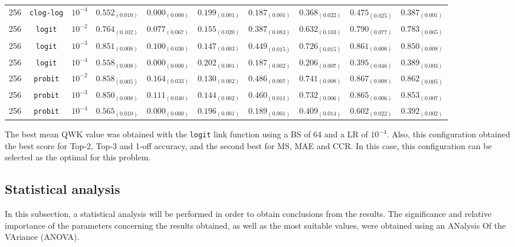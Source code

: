 \documentclass[journal]{IEEEtran}
\begin{document}
\begin{table}[!t]
\begin{tabular}{c@{\hskip 0.15cm}c@{\hskip 0.15cm}c@{\hskip 0.15cm}c@{\hskip 0.30cm}c@{\hskip 0.20cm}c@{\hskip 0.20cm}c@{\hskip 0.20cm}c@{\hskip 0.20cm}c@{\hskip 0.20cm}c}
			256 & \texttt{clog-log} & $10^{-4}$ & $0.552_{(0.010)}$ & $0.000_{(0.000)}$ & $0.199_{(0.001)}$ & $0.187_{(0.001)}$ & $0.368_{(0.022)}$ & $0.475_{(0.025)}$ & $0.387_{(0.001)}$\\
			256 & \texttt{logit} & $10^{-2}$ & $0.764_{(0.102)}$ & $0.077_{(0.067)}$ & $0.155_{(0.020)}$ & $0.387_{(0.083)}$ & $0.632_{(0.103)}$ & $0.790_{(0.077)}$ & $0.783_{(0.065)}$\\
			256 & \texttt{logit} & $10^{-3}$ & $0.851_{(0.008)}$ & $0.100_{(0.030)}$ & $0.147_{(0.003)}$ & $0.449_{(0.015)}$ & $0.726_{(0.015)}$ & $0.861_{(0.006)}$ & $0.850_{(0.008)}$\\
			256 & \texttt{logit} & $10^{-4}$ & $0.558_{(0.008)}$ & $0.000_{(0.000)}$ & $0.202_{(0.001)}$ & $0.187_{(0.002)}$ & $0.206_{(0.007)}$ & $0.395_{(0.046)}$ & $0.389_{(0.003)}$\\
			256 & \texttt{probit} & $10^{-2}$ & $0.858_{(0.005)}$ & $0.164_{(0.033)}$ & $0.130_{(0.002)}$ & $0.486_{(0.007)}$ & $0.741_{(0.008)}$ & $0.867_{(0.008)}$ & $0.862_{(0.005)}$\\
			256 & \texttt{probit} & $10^{-3}$ & $0.850_{(0.008)}$ & $0.111_{(0.040)}$ & $0.144_{(0.002)}$ & $0.460_{(0.011)}$ & $0.732_{(0.006)}$ & $0.865_{(0.006)}$ & $0.853_{(0.007)}$\\
			256 & \texttt{probit} & $10^{-4}$ & $0.565_{(0.010)}$ & $0.000_{(0.000)}$ & $0.196_{(0.001)}$ & $0.189_{(0.001)}$ & $0.409_{(0.014)}$ & $0.602_{(0.022)}$ & $0.392_{(0.002)}$\\
			\hline
			\hline
		\end{tabular}
	\end{table}
	
	The best mean QWK value was obtained with the \texttt{logit} link function using a BS of 64 and a LR of $10^{-4}$. Also, this configuration obtained the best score for Top-2, Top-3 and 1-off accuracy, and the second best for MS, MAE and CCR. In this case, this configuration can be selected as the optimal for this problem.
	
	\subsection{Statistical analysis}
	\label{sect:statisticalanalysis}
	In this subsection, a statistical analysis will be performed in order to obtain conclusions from the results. The significance and relative importance of the parameters concerning the results obtained, as well as the most suitable values, were obtained using an ANalysis Of the VAriance (ANOVA).
	
\end{document}
